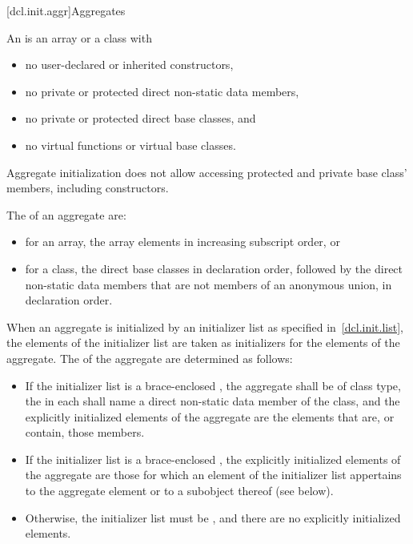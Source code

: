 [dcl.init.aggr]{Aggregates}%
%
%
%
%
%
%

\pnum
An  is an array or a class with
\begin{itemize}
\item
no user-declared or inherited constructors,
\item
no private or protected direct non-static data members,
\item
no private or protected direct base classes, and
\item
no virtual functions or virtual base classes.
\end{itemize}
\begin{note}
Aggregate initialization does not allow accessing
protected and private base class' members, including constructors.
\end{note}

\pnum
The  of an aggregate are:
\begin{itemize}
\item
for an array, the array elements in increasing subscript order, or
\item
for a class, the direct base classes in declaration order,
followed by the direct non-static data members
that are not members of an anonymous union, in declaration order.
\end{itemize}

\pnum
When an aggregate is initialized by an initializer list
as specified in~\ref{dcl.init.list},
the elements of the initializer list are taken as initializers
for the elements of the aggregate.
The 
of the aggregate are determined as follows:
\begin{itemize}
\item
If the initializer list is
a brace-enclosed ,
the aggregate shall be of class type,
the  in each 
shall name a direct non-static data member of the class, and
the explicitly initialized elements of the aggregate
are the elements that are, or contain, those members.
\item
If the initializer list is a brace-enclosed ,
the explicitly initialized elements of the aggregate
are those for which an element of the initializer list
appertains to the aggregate element or to a subobject thereof (see below).
\item
Otherwise, the initializer list must be \tcode{\{\}},
and there are no explicitly initialized elements.
\end{itemize}

